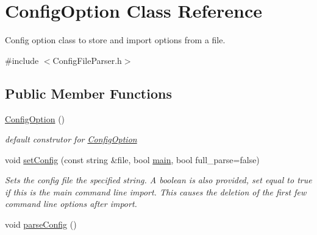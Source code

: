 \hypertarget{class_config_option}{}\section{Config\+Option Class Reference}
\label{class_config_option}


Config option class to store and import options from a file.  




{\ttfamily \#include $<$Config\+File\+Parser.\+h$>$}

\subsection*{Public Member Functions}
\begin{DoxyCompactItemize}
\item 
\hyperlink{class_config_option_ac0639cf9fc6660b1436ebc9e7af52525}{Config\+Option} ()\hypertarget{class_config_option_ac0639cf9fc6660b1436ebc9e7af52525}{}\label{class_config_option_ac0639cf9fc6660b1436ebc9e7af52525}

\begin{DoxyCompactList}\small\item\em default construtor for \hyperlink{class_config_option}{Config\+Option} \end{DoxyCompactList}\item 
void \hyperlink{class_config_option_ac1ae69813100e755359b25b11dfeb8c7}{set\+Config} (const string \&file, bool \hyperlink{_speciation_counter_8cpp_a3c04138a5bfe5d72780bb7e82a18e627}{main}, bool full\+\_\+parse=false)
\begin{DoxyCompactList}\small\item\em Sets the config file the specified string. A boolean is also provided, set equal to true if this is the main command line import. This causes the deletion of the first few command line options after import. \end{DoxyCompactList}\item 
void \hyperlink{class_config_option_a45cdefa1516c378e5a90803d594ccd34}{parse\+Config} ()\hypertarget{class_config_option_a45cdefa1516c378e5a90803d594ccd34}{}\label{class_config_option_a45cdefa1516c378e5a90803d594ccd34}


\end{DoxyCompactItemize}
